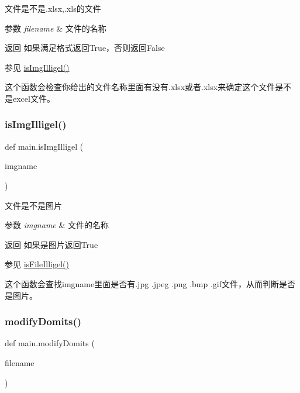 文件是不是.\+xlsx,.xls的文件 


\begin{DoxyParams}{参数}
{\em filename} & 文件的名称 \\
\hline
\end{DoxyParams}
\begin{DoxyReturn}{返回}
如果满足格式返回\+True，否则返回\+False 
\end{DoxyReturn}
\begin{DoxySeeAlso}{参见}
\mbox{\hyperlink{namespacemain_a0deb3fcf5caed9b545bb317bc0f2486f}{is\+Img\+Illigel()}}
\end{DoxySeeAlso}
这个函数会检查你给出的文件名称里面有没有.\+xlsx或者.\+xlsx来确定这个文件是不是excel文件。 \mbox{\label{namespacemain_a0deb3fcf5caed9b545bb317bc0f2486f}} 
\subsubsection{\texorpdfstring{isImgIlligel()}{isImgIlligel()}}
{\footnotesize\ttfamily def main.\+is\+Img\+Illigel (\begin{DoxyParamCaption}\item[{}]{imgname }\end{DoxyParamCaption})}



文件是不是图片 


\begin{DoxyParams}{参数}
{\em imgname} & 文件的名称 \\
\hline
\end{DoxyParams}
\begin{DoxyReturn}{返回}
如果是图片返回\+True 
\end{DoxyReturn}
\begin{DoxySeeAlso}{参见}
\mbox{\hyperlink{namespacemain_ab4bfdca65955984f28c72a5d0daec565}{is\+File\+Illigel()}}
\end{DoxySeeAlso}
这个函数会查找imgname里面是否有.\+jpg .jpeg .png .bmp .gif文件，从而判断是否是图片。 \mbox{\label{namespacemain_a8da19f25dec98a742cf10ab27b83bf73}} 
\subsubsection{\texorpdfstring{modifyDomits()}{modifyDomits()}}
{\footnotesize\ttfamily def main.\+modify\+Domits (\begin{DoxyParamCaption}\item[{}]{filename }\end{DoxyParamCaption})}

